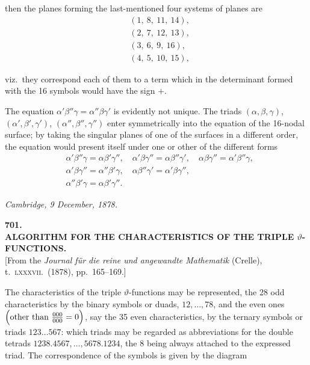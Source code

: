 \documentclass[11pt]{article}
\begin{document}
then the planes forming the last-mentioned four systems of planes are
\[
\begin{aligned}
& (1,\ 8,\ 11,\ 14), \\
& (2,\ 7,\ 12,\ 13), \\
& (3,\ 6,\ 9,\ 16), \\
& (4,\ 5,\ 10,\ 15),
\end{aligned}
\]

viz.\ they correspond each of them to a term which in the determinant formed with the 16 symbols would have the sign $+$.

\medskip

The equation $\alpha'\beta''\gamma = \alpha''\beta\gamma'$ is evidently not unique. The triads $(\alpha, \beta, \gamma)$, $(\alpha', \beta', \gamma')$, $(\alpha'', \beta'', \gamma'')$ enter symmetrically into the equation of the 16-nodal surface; by taking the singular planes of one of the surfaces in a different order, the equation would present itself under one or other of the different forms
\[
\begin{aligned}
& \alpha'\beta''\gamma = \alpha\beta'\gamma'', \quad \alpha'\beta\gamma'' = \alpha\beta''\gamma', \quad \alpha\beta\gamma'' = \alpha'\beta''\gamma, \\
& \alpha'\beta\gamma'' = \alpha''\beta'\gamma, \quad \alpha\beta''\gamma' = \alpha'\beta\gamma'', \\
& \alpha''\beta'\gamma = \alpha\beta'\gamma''.
\end{aligned}
\]

\medskip
\hfill\textit{Cambridge, 9 December, 1878.}

\bigskip
\begin{center}
\large\textbf{701.}\\[6pt]
\large\textbf{ALGORITHM FOR THE CHARACTERISTICS OF THE TRIPLE $\vartheta$-FUNCTIONS.}\\[6pt]
\small [From the \textit{Journal f\"ur die reine und angewandte Mathematik} (Crelle), t.~\textsc{lxxxvii}.~(1878), pp.~165--169.]
\end{center}

\medskip

The characteristics of the triple $\vartheta$-functions may be represented, the 28 odd characteristics by the binary symbols or duads, $12, \ldots, 78$, and the even ones $\Bigl(\text{other than }\tfrac{000}{000} = 0\Bigr)$, say the 35 even characteristics, by the ternary symbols or triads $123 \ldots 567$: which triads may be regarded as abbreviations for the double tetrads $1238.4567, \ldots, 5678.1234$, the 8 being always attached to the expressed triad. The correspondence of the symbols is given by the diagram
\end{document}

